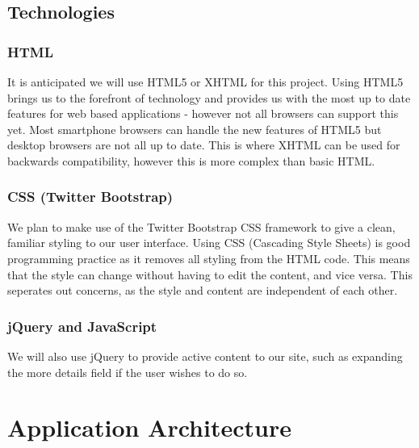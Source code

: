 \documentclass{sig-alt-release2}
\begin{document}
\subsection{Technologies}

\subsubsection{HTML}
It is anticipated we will use HTML5 or XHTML for this project. Using HTML5 brings us to the forefront of technology and provides us with the most up to date features for web based applications - however not all browsers can support this yet. Most smartphone browsers can handle the new features of HTML5     but desktop browsers are not all up to date. This is where XHTML can be used for backwards compatibility, however this is more complex than basic HTML.

\subsubsection{CSS (Twitter Bootstrap)}
We plan to make use of the Twitter Bootstrap CSS framework to give a clean, familiar styling to our user interface. Using CSS (Cascading Style Sheets) is good programming practice as it removes all styling from the HTML code. This means that the style can change without having to edit the content, and vice versa. This seperates out concerns, as the style and content are independent of each other.

\subsubsection{jQuery and JavaScript}
We will also use jQuery to provide active content to our site, such as expanding the more details field if the user wishes to do so.

\section{Application Architecture}
\end{document}
